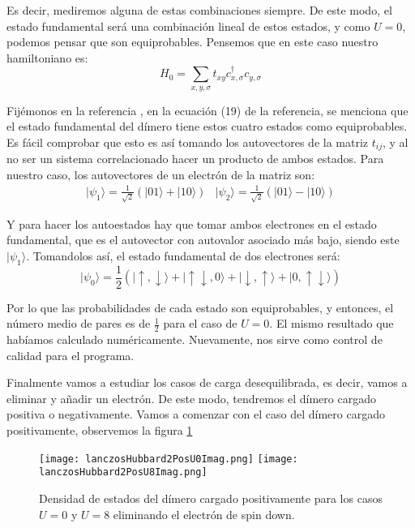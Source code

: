 \documentclass[12pt,twoside]{article}
\begin{document}
Es decir, mediremos alguna de estas combinaciones siempre. De este modo, el estado fundamental será una combinación lineal de estos estados, y como $U = 0$, podemos pensar que son equiprobables. Pensemos que en este caso nuestro hamiltoniano es:
$$
H_0 = \sum_{x, y, \sigma}t_{xy}c^{\dagger}_{x,\sigma}c_{y,\sigma}
$$

Fijémonos en la referencia \cite{GreeneDiniz2024}, en la ecuación (19) de la referencia, se menciona que el estado fundamental del dímero tiene estos cuatro estados como equiprobables. Es fácil comprobar que esto es así tomando los autovectores de la matriz $t_{ij}$, y al no ser un sistema correlacionado hacer un producto de ambos estados. Para nuestro caso, los autovectores de un electrón de la matriz son:
\begin{equation}
  \begin{array}{cc}
    |\psi_1\rangle = \frac{1}{\sqrt{2}}\left(|01\rangle + |10\rangle\right) & |\psi_2\rangle = \frac{1}{\sqrt{2}}\left(|01\rangle - |10\rangle\right)
  \end{array}
\end{equation}

Y para hacer los autoestados hay que tomar ambos electrones en el estado fundamental, que es el autovector con autovalor asociado más bajo, siendo este $|\psi_1\rangle$. Tomandolos así, el estado fundamental de dos electrones será:
$$
|\psi_0\rangle = \frac{1}{2}(|\uparrow, \downarrow\rangle + |\uparrow\downarrow, 0\rangle + |\downarrow, \uparrow\rangle + |0, \uparrow\downarrow\rangle)
$$

Por lo que las probabilidades de cada estado son equiprobables, y entonces, el número medio de pares es de $\frac{1}{2}$ para el caso de $U = 0$. El mismo resultado que habíamos calculado numéricamente. Nuevamente, nos sirve como control de calidad para el programa.

Finalmente vamos a estudiar los casos de carga desequilibrada, es decir, vamos a eliminar y añadir un electrón. De este modo, tendremos el dímero cargado positiva o negativamente. Vamos a comenzar con el caso del dímero cargado positivamente, observemos la figura \ref{fig:positiveDimer}
\begin{figure}[h!]
  \begin{center}
     \texttt{[image: lanczosHubbard2PosU0Imag.png]}
     \texttt{[image: lanczosHubbard2PosU8Imag.png]}
  \end{center}
  \caption{Densidad de estados del dímero cargado positivamente para los casos $U = 0$ y $U = 8$ eliminando el electrón de spin down.}
  \label{fig:positiveDimer}
\end{figure}
\end{document}
